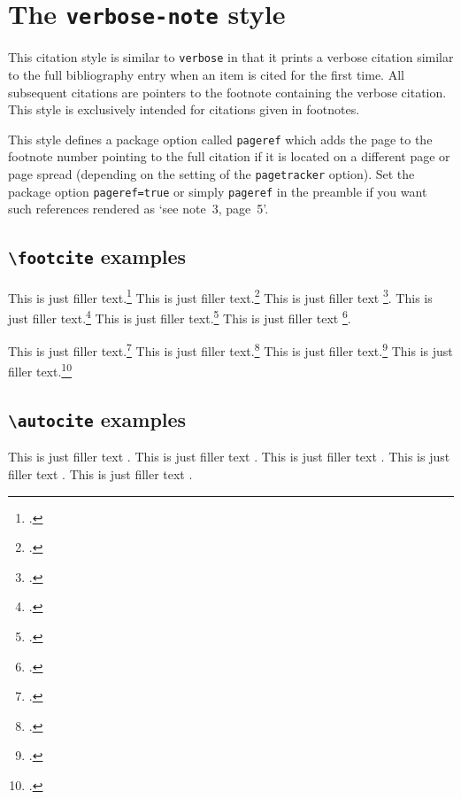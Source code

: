 \documentclass[a4paper]{article}
\newcommand{\cmd}[1]{\texttt{\textbackslash #1}}
\begin{document}
\section*{The \texttt{verbose-note} style}

This citation style is similar to \texttt{verbose} in that it prints
a verbose citation similar to the full bibliography entry when an
item is cited for the first time. All subsequent citations are
pointers to the footnote containing the verbose citation. This style
is exclusively intended for citations given in footnotes.

This style defines a package option called \texttt{pageref} which
adds the page to the footnote number pointing to the full citation
if it is located on a different page or page spread (depending on
the setting of the \texttt{pagetracker} option). Set the package
option \texttt{pageref=true} or simply \texttt{pageref} in the
preamble if you want such references rendered as `see note~3,
page~5'.

\subsection*{\cmd{footcite} examples}

This is just filler text.\footcite{aristotle:anima}
This is just filler text.\footcite{aristotle:physics}
This is just filler text \footcite{averroes/bland}.
This is just filler text.\footcite{aristotle:anima}
This is just filler text.\footcite{aristotle:physics}
This is just filler text \footcite{averroes/bland}.

\clearpage

This is just filler text.\footcite{kant:kpv}
This is just filler text.\footcite{kant:ku}
This is just filler text.\footcite[24]{kant:kpv}
This is just filler text.\footcite[59--63]{kant:ku}

\clearpage

\subsection*{\cmd{autocite} examples}


This is just filler text \autocite{aristotle:rhetoric}.
This is just filler text \autocite{aristotle:rhetoric}.
This is just filler text \autocite{aristotle:anima}.
This is just filler text \autocite{aristotle:physics}.
This is just filler text \autocite{averroes/bland}.

\clearpage


\printshorthands
\printbibliography
\end{document}
